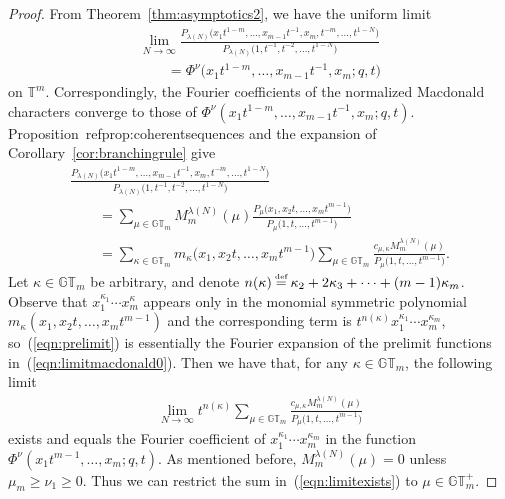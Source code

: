 \documentclass[pdftex]{sigma}
\numberwithin{equation}{section}
\newcommand\myeq{\mathrel{\stackrel{\makebox[0pt]{\mbox{\normalfont\tiny def}}}{=}}}
\newcommand{\GT}{\mathbb{GT}}
\newcommand{\GTp}{\mathbb{GT}^+}
\newcommand{\TT}{\mathbb{T}}
\begin{document}
\begin{proof}
From Theorem~\ref{thm:asymptotics2}, we have the uniform limit
\begin{gather}
\lim_{N\rightarrow\infty}{\frac{P_{\lambda(N)}\big(x_1t^{1-m}, \dots, x_{m-1}t^{-1}, x_m, t^{-m}, \dots, t^{1 - N}\big)}{P_{\lambda(N)}\big(1, t^{-1}, t^{-2}, \dots, t^{1 - N}\big)}} \nonumber\\
\qquad{} = \Phi^{\nu}\big(x_1t^{1-m}, \dots, x_{m-1}t^{-1}, x_m; q, t\big)\label{eqn:limitmacdonald0}
\end{gather}
on $\TT^m$. Correspondingly, the Fourier coef\/f\/icients of the normalized Macdonald characters converge to those of $\Phi^{\nu}(x_1 t^{1-m}, \dots, x_{m-1} t^{-1}, x_m; q, t)$. Proposition~ref{prop:coherentsequences} and the expansion of Corollary~\ref{cor:branchingrule} give
\begin{gather}
\frac{P_{\lambda(N)}\big(x_1t^{1-m}, \dots, x_{m-1}t^{-1}, x_m, t^{-m}, \dots, t^{1-N}\big)}{P_{\lambda(N)}\big(1, t^{-1}, t^{-2}, \dots, t^{1-N}\big)}\nonumber\\
\qquad{} = \sum_{ \mu\in\GT_m }{ M_m^{\lambda(N)}(\mu) \frac{P_{\mu}\big(x_1, x_2t, \dots, x_mt^{m-1}\big)}{P_{\mu}\big(1, t, \dots, t^{m-1}\big)} }\nonumber\\
\qquad{}= \sum_{\kappa\in\GT_m}{ m_{\kappa}\big(x_1, x_2t, \dots, x_mt^{m-1}\big) \sum_{\mu\in\GT_m}{ \frac{c_{\mu, \kappa}M_m^{\lambda(N)}(\mu)}{P_{\mu}\big(1, t, \dots, t^{m-1}\big)} } }.\label{eqn:prelimit}
\end{gather}
Let $\kappa\in\GT_m$ be arbitrary, and denote $n(\kappa) \myeq \kappa_2 + 2\kappa_3 + \dots + (m-1)\kappa_m$. Observe that $x_1^{\kappa_1}\cdots x_m^{\kappa}$ appears only in the monomial symmetric polynomial $m_{\kappa}(x_1, x_2t, \dots, x_mt^{m-1})$ and the corresponding term is $t^{n(\kappa)}x_1^{\kappa_1}\cdots x_m^{\kappa_m}$, so~(\ref{eqn:prelimit}) is essentially the Fourier expansion of the prelimit functions in~(\ref{eqn:limitmacdonald0}). Then we have that, for any $\kappa\in\GT_m$, the following limit
\begin{gather}\label{eqn:limitexists}
\lim_{N\rightarrow\infty}{ t^{n(\kappa)} \sum_{\mu\in\GT_m}{ \frac{c_{\mu, \kappa}M_m^{\lambda(N)}(\mu)}{P_{\mu}\big(1, t, \dots, t^{m-1}\big)} } }
\end{gather}
exists and equals the Fourier coef\/f\/icient of $x_1^{\kappa_1}\cdots x_m^{\kappa_m}$ in the function $\Phi^{\nu}(x_1t^{m-1}, \dots, x_m; q, t)$. As mentioned before, $M^{\lambda(N)}_m(\mu) = 0$ unless $\mu_m \geq \nu_1 \geq 0$. Thus we can restrict the sum in~(\ref{eqn:limitexists}) to $\mu\in\GTp_m$.

\end{proof}
\end{document}

